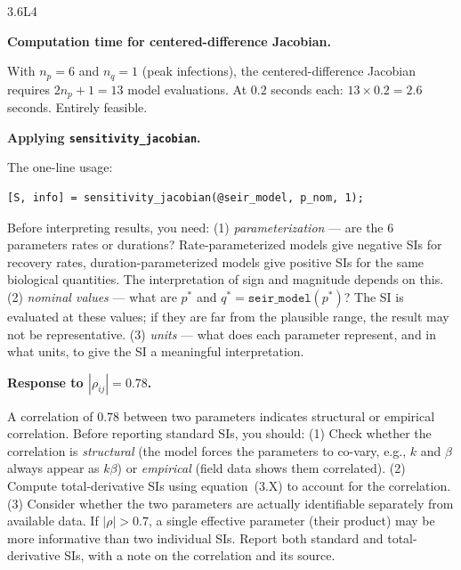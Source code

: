 \begin{solution}{3.6}{L4}

\solanswer

 \textbf{Computation time for centered-difference Jacobian.}

With $n_p = 6$ \POIs and $n_q = 1$ \QOI (peak infections), the
centered-difference Jacobian requires $2n_p + 1 = 13$ model evaluations.
At $0.2$ seconds each: $13 \times 0.2 = 2.6$ seconds. Entirely feasible.

 \textbf{Applying \texttt{sensitivity\_jacobian}.}

The one-line usage:
\begin{verbatim}
[S, info] = sensitivity_jacobian(@seir_model, p_nom, 1);
\end{verbatim}
Before interpreting results, you need: (1) \textit{parameterization} —
are the 6 parameters rates or durations? Rate-parameterized models
give negative SIs for recovery rates, duration-parameterized models
give positive SIs for the same biological quantities. The interpretation
of sign and magnitude depends on this. (2) \textit{nominal values} —
what are $p^*$ and $q^* = \texttt{seir\_model}(p^*)$? The SI is
evaluated at these values; if they are far from the plausible range,
the result may not be representative. (3) \textit{units} — what does
each parameter represent, and in what units, to give the SI a
meaningful interpretation.

 \textbf{Response to $|\rho_{ij}| = 0.78$.}

A correlation of $0.78$ between two parameters indicates structural
or empirical correlation. Before reporting standard SIs, you should:
(1) Check whether the correlation is \emph{structural} (the model
forces the parameters to co-vary, e.g., $k$ and $\beta$ always appear
as $k\beta$) or \emph{empirical} (field data shows them correlated).
(2) Compute total-derivative SIs using equation~(3.X) to account for
the correlation. (3) Consider whether the two parameters are actually
identifiable separately from available data. If $|\rho| > 0.7$, a
single effective parameter (their product) may be more informative
than two individual SIs. Report both standard and total-derivative SIs,
with a note on the correlation and its source.


\end{solution}

